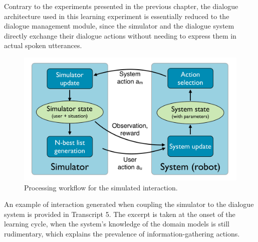 Contrary to the experiments presented in the previous chapter, the dialogue architecture used in this learning experiment is essentially reduced to the dialogue management module, since the simulator and the dialogue system directly exchange their dialogue actions without needing to express them in actual spoken utterances.   

\begin{figure}[h]
\begin{center}
\includegraphics[scale=0.3]{imgs/exp2_architecture.pdf}
\end{center} 
\caption{Processing workflow for the simulated interaction.}
\label{fig:exp2_architecture}
\end{figure}

An example of interaction generated when coupling the simulator to the dialogue system is provided in Transcript 5. The excerpt is taken at the onset of the learning cycle, when the system's knowledge of the domain models is still rudimentary, which explains the prevalence of information-gathering actions. 

